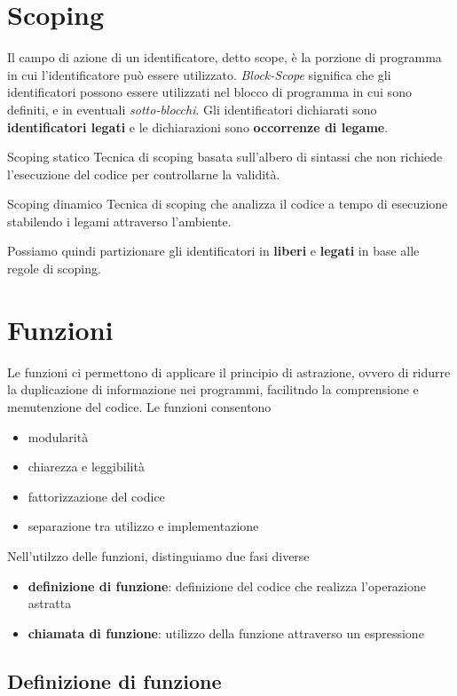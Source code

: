 \documentclass{article}
\begin{document}
\section{Scoping}
Il campo di azione di un identificatore, detto scope, è la porzione di programma in cui l'identificatore può essere utilizzato. \emph{Block-Scope} significa che gli identificatori possono essere utilizzati nel blocco di programma in cui sono definiti, e in eventuali \emph{sotto-blocchi}.
Gli identificatori dichiarati sono \textbf{identificatori legati} e le dichiarazioni sono \textbf{occorrenze di legame}.
\begin{dfn}{Scoping statico}
    Tecnica di scoping basata sull'albero di sintassi che non richiede l'esecuzione del codice per controllarne la validità.
\end{dfn}
\begin{dfn}{Scoping dinamico}
    Tecnica di scoping che analizza il codice a tempo di esecuzione stabilendo i legami attraverso l'ambiente.
\end{dfn}
Possiamo quindi partizionare gli identificatori in \textbf{liberi} e \textbf{legati} in base alle regole di scoping.

\pagebreak
\section{Funzioni}
Le funzioni ci permettono di applicare il principio di astrazione, ovvero di ridurre la duplicazione di informazione nei programmi, facilitndo la comprensione e menutenzione del codice. Le funzioni consentono
\begin{itemize}
    \item modularità
    \item chiarezza e leggibilità
    \item fattorizzazione del codice
    \item separazione tra utilizzo e implementazione
\end{itemize}
Nell'utilzzo delle funzioni, distinguiamo due fasi diverse
\begin{itemize}
    \item \textbf{definizione di funzione}: definizione del codice che realizza l'operazione astratta
    \item \textbf{chiamata di funzione}: utilizzo della funzione attraverso un espressione
\end{itemize}

\subsection{Definizione di funzione}
\end{document}
